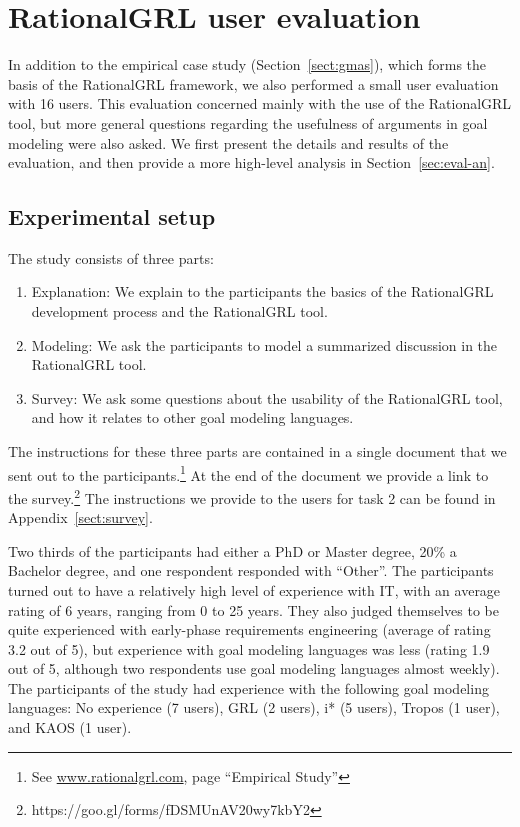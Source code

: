 \section{RationalGRL user evaluation}
\label{sect:validation}

In addition to the empirical case study (Section~\ref{sect:gmas}), which forms the basis of the RationalGRL framework, we also performed a small user evaluation with 16 users. This evaluation concerned mainly with the use of the RationalGRL tool, but more general questions regarding the usefulness of arguments in goal modeling were also asked. We first present the details and results of the evaluation, and then provide a more high-level analysis in Section~\ref{sec:eval-an}.

\subsection{Experimental setup}
The study consists of three parts:
\begin{enumerate}
\item Explanation: We explain to the participants the basics of the RationalGRL development process and the RationalGRL tool.
\item Modeling: We ask the participants to model a summarized discussion in the RationalGRL tool.
\item Survey: We ask some questions about the usability of the RationalGRL tool, and how it relates to other goal modeling languages.
\end{enumerate}

The instructions for these three parts are contained in a single document that we sent out to the participants.\footnote{See \url{www.rationalgrl.com}, page ``Empirical Study''} At the end of the document we provide a link to the survey.\footnote{https://goo.gl/forms/fDSMUnAV20wy7kbY2} The instructions we provide to the users for task 2 can be found in Appendix~\ref{sect:survey}.

Two thirds of the participants had either a PhD or Master degree, 20\% a Bachelor degree, and one respondent responded with ``Other''. The participants turned out to have a relatively high level of experience with IT, with an average rating of 6 years, ranging from 0 to 25 years. They also judged themselves to be quite experienced with early-phase requirements engineering (average of rating 3.2 out of 5), but experience with goal modeling languages was less (rating 1.9 out of 5, although two respondents use goal modeling languages almost weekly). The participants of the study had experience with the following goal modeling languages: No experience (7 users), GRL (2 users), i* (5 users), Tropos (1 user), and KAOS (1 user).

